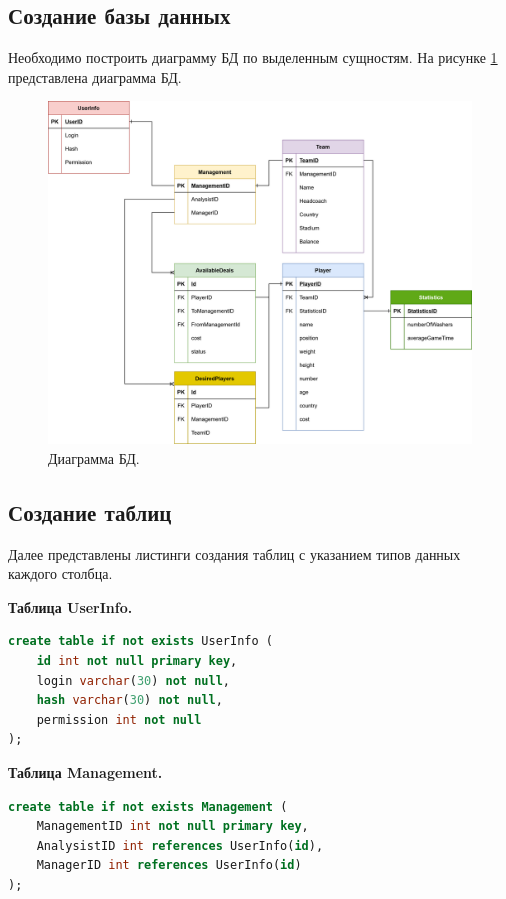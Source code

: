 \subsection{Создание базы данных}
Необходимо построить диаграмму БД по выделенным сущностям. На рисунке \ref{img:DB} представлена диаграмма БД.
\begin{figure}[h!]
	\centering
	\includegraphics[scale=0.18]{img/DB.png}
	\caption{Диаграмма БД.}
	\label{img:DB}
\end{figure}
\newpage
\subsection{Создание таблиц}
Далее представлены листинги создания таблиц с указанием типов данных каждого столбца.

\textbf{Таблица UserInfo.}
\begin{lstlisting}[label={lst:UserInfo},caption=Создание таблицы UserInfo., language=SQL]
create table if not exists UserInfo (
	id int not null primary key,
	login varchar(30) not null,
	hash varchar(30) not null,
	permission int not null
);
\end{lstlisting}

\textbf{Таблица Management.}
\begin{lstlisting}[label={lst:Manag},caption=Создание таблицы Management., language=SQL]
create table if not exists Management (
	ManagementID int not null primary key,
	AnalysistID int references UserInfo(id),
	ManagerID int references UserInfo(id)
);
\end{lstlisting}

